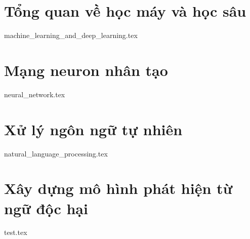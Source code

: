 \section{Tổng quan về học máy và học sâu}
{machine_learning_and_deep_learning.tex}

\section{Mạng neuron nhân tạo}
{neural_network.tex}

\section{Xử lý ngôn ngữ tự nhiên}
{natural_language_processing.tex}

\section{Xây dựng mô hình phát hiện từ ngữ độc hại}
{test.tex}
